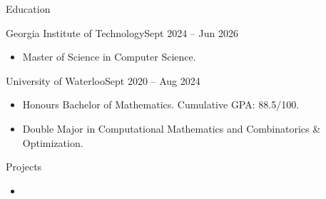 \documentclass[]{mcdowellcv}
\begin{document}
	\makeheader
	\begin{cvsection}{Education}
		\begin{cvsubsection}{Georgia Institute of Technology}{}{Sept 2024 -- Jun 2026}
			\begin{itemize}
				\item Master of Science in Computer Science.
			\end{itemize}
		\end{cvsubsection}
		\begin{cvsubsection}{University of Waterloo}{}{Sept 2020 -- Aug 2024}
			\begin{itemize}
				\item Honours Bachelor of Mathematics. Cumulative GPA: 88.5/100.
				\item Double Major in Computational Mathematics and Combinatorics \& Optimization.
			\end{itemize}
		\end{cvsubsection}
	\end{cvsection}
	
	
	\begin{cvsection}{Projects}
		\begin{cvsubsection}{}{}{}
			\begin{itemize}
				\item 
			\end{itemize}
		\end{cvsubsection}
	\end{cvsection}

	
	

	
	
	
\end{document}
